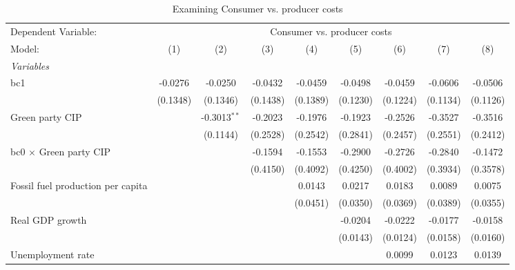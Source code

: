 
\begin{table}[htbp]
   \caption{Examining Consumer vs. producer costs}
   \centering
   \begin{tabular}{lcccccccc}
      \tabularnewline \midrule \midrule
      Dependent Variable: & \multicolumn{8}{c}{Consumer vs. producer costs}\\
      Model:                                  & (1)      & (2)            & (3)      & (4)      & (5)      & (6)      & (7)      & (8)\\  
      \midrule
      \emph{Variables}\\
      bc1                                     & -0.0276  & -0.0250        & -0.0432  & -0.0459  & -0.0498  & -0.0459  & -0.0606  & -0.0506\\   
                                              & (0.1348) & (0.1346)       & (0.1438) & (0.1389) & (0.1230) & (0.1224) & (0.1134) & (0.1126)\\   
      Green party CIP                         &          & -0.3013$^{**}$ & -0.2023  & -0.1976  & -0.1923  & -0.2526  & -0.3527  & -0.3516\\   
                                              &          & (0.1144)       & (0.2528) & (0.2542) & (0.2841) & (0.2457) & (0.2551) & (0.2412)\\   
      bc0 $\times$ Green party CIP            &          &                & -0.1594  & -0.1553  & -0.2900  & -0.2726  & -0.2840  & -0.1472\\   
                                              &          &                & (0.4150) & (0.4092) & (0.4250) & (0.4002) & (0.3934) & (0.3578)\\   
      Fossil fuel production per capita       &          &                &          & 0.0143   & 0.0217   & 0.0183   & 0.0089   & 0.0075\\   
                                              &          &                &          & (0.0451) & (0.0350) & (0.0369) & (0.0389) & (0.0355)\\   
      Real GDP growth                         &          &                &          &          & -0.0204  & -0.0222  & -0.0177  & -0.0158\\   
                                              &          &                &          &          & (0.0143) & (0.0124) & (0.0158) & (0.0160)\\   
      Unemployment rate                       &          &                &          &          &          & 0.0099   & 0.0123   & 0.0139\\   

\end{tabular}
\end{table}
